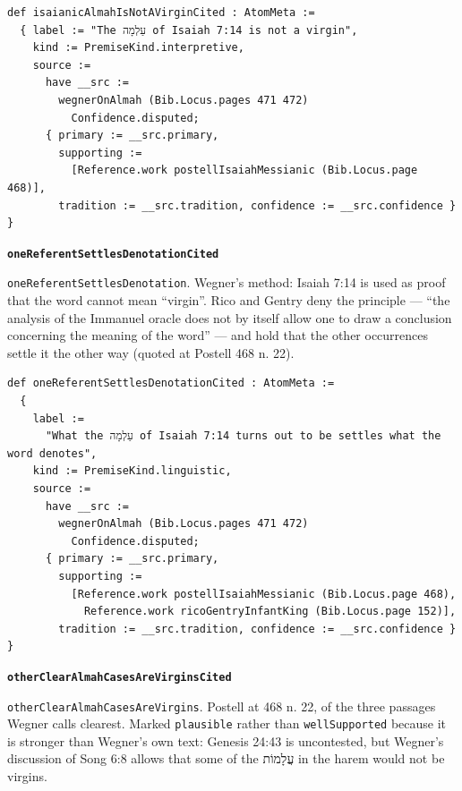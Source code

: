 \documentclass[11pt]{article}
\begin{document}
{\small\begin{verbatim}
def isaianicAlmahIsNotAVirginCited : AtomMeta :=
  { label := "The עַלְמָה of Isaiah 7:14 is not a virgin",
    kind := PremiseKind.interpretive,
    source :=
      have __src :=
        wegnerOnAlmah (Bib.Locus.pages 471 472)
          Confidence.disputed;
      { primary := __src.primary,
        supporting :=
          [Reference.work postellIsaiahMessianic (Bib.Locus.page 468)],
        tradition := __src.tradition, confidence := __src.confidence } }
\end{verbatim}}
\par\medskip\noindent\textbf{\texttt{one\allowbreak{}Referent\allowbreak{}Settles\allowbreak{}Denotation\allowbreak{}Cited}}\par\nobreak\noindent
\texttt{one\allowbreak{}Referent\allowbreak{}Settles\allowbreak{}Denotation}. Wegner’s method: Isaiah 7:14 is used as proof that the word cannot mean “virgin”. Rico and Gentry deny the principle — “the analysis of the Immanuel oracle does not by itself allow one to draw a conclusion concerning the meaning of the word” — and hold that the other occurrences settle it the other way (quoted at Postell 468 n. 22).

{\small\begin{verbatim}
def oneReferentSettlesDenotationCited : AtomMeta :=
  {
    label :=
      "What the עַלְמָה of Isaiah 7:14 turns out to be settles what the word denotes",
    kind := PremiseKind.linguistic,
    source :=
      have __src :=
        wegnerOnAlmah (Bib.Locus.pages 471 472)
          Confidence.disputed;
      { primary := __src.primary,
        supporting :=
          [Reference.work postellIsaiahMessianic (Bib.Locus.page 468),
            Reference.work ricoGentryInfantKing (Bib.Locus.page 152)],
        tradition := __src.tradition, confidence := __src.confidence } }
\end{verbatim}}
\par\medskip\noindent\textbf{\texttt{other\allowbreak{}Clear\allowbreak{}Almah\allowbreak{}Cases\allowbreak{}Are\allowbreak{}Virgins\allowbreak{}Cited}}\par\nobreak\noindent
\texttt{other\allowbreak{}Clear\allowbreak{}Almah\allowbreak{}Cases\allowbreak{}Are\allowbreak{}Virgins}. Postell at 468 n. 22, of the three passages Wegner calls clearest. Marked \texttt{plausible} rather than \texttt{well\allowbreak{}Supported} because it is stronger than Wegner’s own text: Genesis 24:43 is uncontested, but Wegner’s discussion of Song 6:8 allows that some of the עֲלָמוֹת in the harem would not be virgins.
\end{document}
